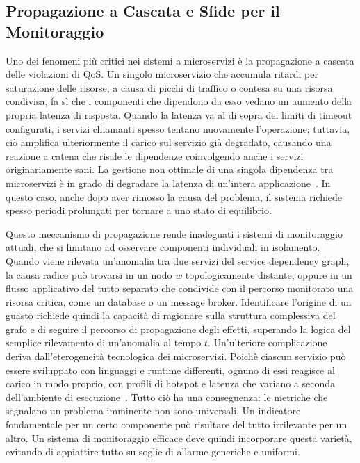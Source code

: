 \subsection{Propagazione a Cascata e Sfide per il Monitoraggio}
\label{subsec:cascading}

Uno dei fenomeni più critici nei sistemi a microservizi è la propagazione a cascata delle 
violazioni di \gls{QoS}. Un singolo microservizio che accumula ritardi per saturazione delle risorse, 
a causa di picchi di traffico o contesa su una risorsa condivisa, fa sì che i componenti che 
dipendono da esso vedano un aumento della propria latenza di risposta. Quando la latenza va al 
di sopra dei limiti di timeout configurati, i servizi chiamanti spesso tentano nuovamente l'operazione; 
tuttavia, ciò amplifica ulteriormente il carico sul servizio già degradato, causando una reazione a 
catena che risale le dipendenze coinvolgendo anche i servizi originariamente sani. 
La gestione non ottimale di una singola dipendenza tra microservizi è in grado di degradare 
la latenza di un'intera applicazione~\cite{gan2019deathstar}. In questo caso, anche dopo aver rimosso la causa del problema, 
il sistema richiede spesso periodi prolungati per tornare a uno stato di equilibrio.

Questo meccanismo di propagazione rende inadeguati i sistemi di monitoraggio attuali, che si
limitano ad osservare componenti individuali in isolamento. Quando viene rilevata un'anomalia
tra due servizi del service dependency graph, la causa radice può trovarsi in un nodo $w$
topologicamente distante, oppure in un flusso applicativo del tutto separato che condivide
con il percorso monitorato una risorsa critica, come un database o un message broker.
Identificare l'origine di un guasto richiede quindi la capacità di ragionare sulla struttura
complessiva del grafo e di seguire il percorso di propagazione degli effetti, superando la
logica del semplice rilevamento di un'anomalia al tempo $t$.
Un'ulteriore complicazione deriva dall'eterogeneità tecnologica dei microservizi. 
Poichè ciascun servizio può essere sviluppato con linguaggi e runtime differenti, 
ognuno di essi reagisce al carico in modo proprio, con profili di hotspot e latenza che 
variano a seconda dell'ambiente di esecuzione~\cite{gan2019deathstar}. Tutto ciò ha una conseguenza: 
le metriche che segnalano un problema imminente non sono universali. 
Un indicatore fondamentale per un certo componente può risultare del tutto irrilevante per un altro. 
Un sistema di monitoraggio efficace deve quindi incorporare questa varietà, evitando di appiattire 
tutto su soglie di allarme generiche e uniformi. 

